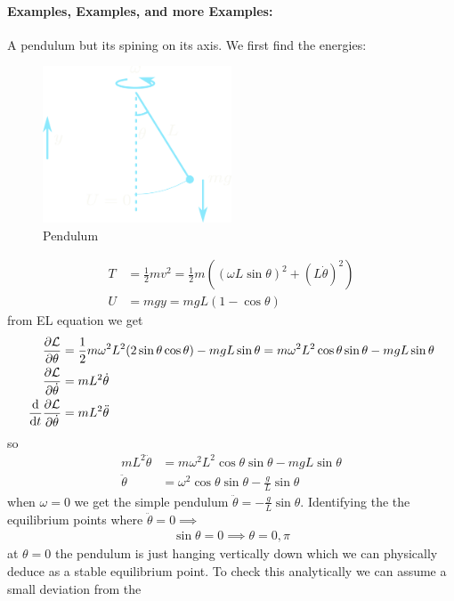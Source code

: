 \documentclass[../main.tex]{subfiles}
\begin{document}
\paragraph*{Examples, Examples, and more Examples:} A pendulum but its spining on its axis. We 
first find  the energies:
\begin{figure}[ht]
    \centering
    \includegraphics[width=0.5\textwidth]{spinningpendulum.png}
    \caption{Pendulum}
\end{figure}
\begin{align*}
    T &= \frac{1}{2} m v^2 = \frac{1}{2} m ((\omega L \sin \theta)^2 + (L \dot \theta)^2) \\
    U &= mg y = mg L (1 - \cos \theta)
\end{align*}
from EL equation we get
\begin{align*}
    \pdv{\mathcal{L}}{\theta} &= \frac{1}{2} m\omega^2 L^2 (2 \sin\theta \cos\theta) - mg L \sin\theta 
        = m\omega^2 L^2 \cos \theta \sin \theta - mgL \sin\theta \\
    \pdv{\mathcal{L}}{\dot \theta} &= m L^2 \dot \theta \\
    \dv{t} \pdv{\mathcal{L}}{\dot \theta} &= m L^2 \ddot \theta
\end{align*}
so 
\begin{align*}
    m L^2 \ddot \theta &= m\omega^2 L^2 \cos \theta \sin \theta - mgL \sin\theta \\
    \ddot \theta &= \omega^2 \cos \theta \sin \theta - \frac{g}{L} \sin \theta
\end{align*}
when $\omega = 0$ we get the simple pendulum $\ddot \theta = - \frac{g}{L} \sin \theta$. Identifying
the the equilibrium points where $\ddot \theta = 0 \implies$
\begin{align*}
    \sin \theta = 0 \implies \theta = 0, \pi
\end{align*}
at $\theta = 0$ the pendulum is just hanging vertically down which we can physically deduce as a
stable equilibrium point. To check this analytically we can assume a small deviation from the
\end{document}
